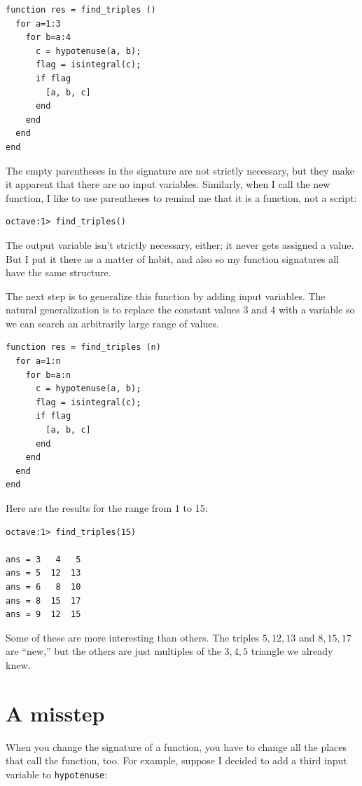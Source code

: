 \documentclass{book}
\begin{document}
\begin{verbatim}
function res = find_triples ()
  for a=1:3
    for b=a:4
      c = hypotenuse(a, b);
      flag = isintegral(c);
      if flag
        [a, b, c]
      end
    end
  end
end
\end{verbatim}

The empty parentheses in the signature are not strictly necessary, but
they make it apparent that there are no input variables. Similarly,
when I call the new function, I like to use parentheses to remind me
that it is a function, not a script:

\begin{verbatim}
octave:1> find_triples()
\end{verbatim}

The output variable isn't strictly necessary, either; it
never gets assigned a value. But I put it there as a matter of
habit, and also so my function signatures all have the same structure.

The next step is to generalize this function by adding input
variables. The natural generalization is to replace the constant
values 3 and 4 with a variable so we can search an arbitrarily large
range of values.

\begin{verbatim}
function res = find_triples (n)
  for a=1:n
    for b=a:n
      c = hypotenuse(a, b);
      flag = isintegral(c);
      if flag
        [a, b, c]
      end
    end
  end
end
\end{verbatim}

Here are the results for the range from 1 to 15:

\begin{verbatim}
octave:1> find_triples(15)

ans = 3   4   5
ans = 5  12  13
ans = 6   8  10
ans = 8  15  17
ans = 9  12  15
\end{verbatim}

Some of these are more interesting than others. The triples
$5,12,13$ and $8,15,17$ are ``new,'' but the others are just
multiples of the $3,4,5$ triangle we already knew.


\section{A misstep}

When you change the signature of a function, you have to change all
the places that call the function, too. For example, suppose
I decided to add a third input variable to {\tt hypotenuse}:
\end{document}
